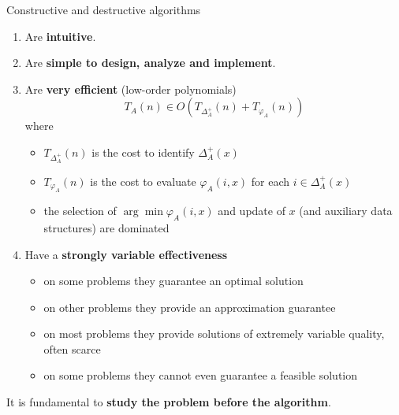 Constructive and destructive algorithms
\begin{enumerate}
	\item Are \textbf{intuitive}.\\
	
	\item Are \textbf{simple to design, analyze and implement}.\\
	
	\item Are \textbf{very efficient} (low-order polynomials)
	$$ T_A (n) \in O \left(T_{\Delta_A^+} (n) + T_{\varphi_A} (n) \right) $$
	where
	\begin{itemize}
		\item $T_{\Delta_A^+} (n)$ is the cost to identify $\Delta_A^+ (x)$
		
		\item $T_{\varphi_A} (n)$ is the cost to evaluate $\varphi_A (i,x)$ for each $i \in \Delta_A^+ (x)$
		
		\item the selection of $\arg \min \varphi_A (i, x)$ and update of $x$ (and auxiliary data structures) are dominated
	\end{itemize}
	\nn
	
	\item Have a \textbf{strongly variable effectiveness}
	\begin{itemize}
		\item on some problems they guarantee an optimal solution
		\item on other problems they provide an approximation guarantee
		\item on most problems they provide solutions of extremely variable quality, often scarce
		\item on some problems they cannot even guarantee a feasible solution
	\end{itemize}
	\nn
\end{enumerate}

It is fundamental to \textbf{study the problem before the algorithm}.\\

